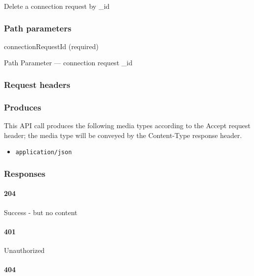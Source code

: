 Delete a connection request by \_id

\hypertarget{path-parameters-59}{%
\subsubsection{Path parameters}\label{path-parameters-59}}

connectionRequestId (required)

{Path Parameter} --- connection request \_id

\hypertarget{request-headers-62}{%
\subsubsection{Request headers}\label{request-headers-62}}

\hypertarget{produces-109}{%
\subsubsection{Produces}\label{produces-109}}

This API call produces the following media types according to the
{Accept} request header; the media type will be conveyed by the
{Content-Type} response header.

\begin{itemize}
\tightlist
\item
  \texttt{application/json}
\end{itemize}

\hypertarget{responses-112}{%
\subsubsection{Responses}\label{responses-112}}

\hypertarget{section-366}{%
\paragraph{204}\label{section-366}}

Success - but no content \protect\hyperlink{}{}

\hypertarget{section-367}{%
\paragraph{401}\label{section-367}}

Unauthorized \protect\hyperlink{}{}

\hypertarget{section-368}{%
\paragraph{404}\label{section-368}}

